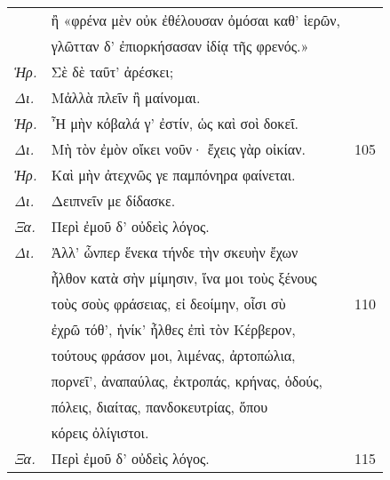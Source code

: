 \documentclass[13pt]{article}
\begin{document}
\begin{greek}
\begin{spacing}{1.5}
\begin{tabularx}{\textwidth}{@{}lXr@{}}
  & ἢ «φρένα μὲν οὐκ ἐθέλουσαν ὀμόσαι καθ' ἱερῶν, & \\
  & γλῶτταν δ' ἐπιορκήσασαν ἰδίᾳ τῆς φρενός.» & \\
  \textit{Ἡρ.} & Σὲ δὲ ταῦτ' ἀρέσκει; & \\
  \textit{Δι.} & \hspace*{8.5em}Μἀλλὰ πλεῖν ἢ μαίνομαι. & \\
  \textit{Ἡρ.} & Ἦ μὴν κόβαλά γ' ἐστίν, ὡς καὶ σοὶ δοκεῖ. & \\
  \textit{Δι.} & Μὴ τὸν ἐμὸν οἴκει νοῦν· ἔχεις γὰρ οἰκίαν. & 105 \\
  \textit{Ἡρ.} & Καὶ μὴν ἀτεχνῶς γε παμπόνηρα φαίνεται. & \\
  \textit{Δι.} & Δειπνεῖν με δίδασκε. & \\
  \textit{Ξα.} & \hspace*{8.5em}Περὶ ἐμοῦ δ' οὐδεὶς λόγος. & \\
  \textit{Δι.} & Ἀλλ' ὧνπερ ἕνεκα τήνδε τὴν σκευὴν ἔχων & \\
  & ἦλθον κατὰ σὴν μίμησιν, ἵνα μοι τοὺς ξένους & \\
  & τοὺς σοὺς φράσειας, εἰ δεοίμην, οἷσι σὺ & 110 \\
  & ἐχρῶ τόθ', ἡνίκ' ἦλθες ἐπὶ τὸν Κέρβερον, & \\
  & τούτους φράσον μοι, λιμένας, ἀρτοπώλια, & \\
  & πορνεῖ', ἀναπαύλας, ἐκτροπάς, κρήνας, ὁδούς, & \\
  & πόλεις, διαίτας, πανδοκευτρίας, ὅπου & \\
  & κόρεις ὀλίγιστοι. & \\
  \textit{Ξα.} & \hspace*{7.5em}Περὶ ἐμοῦ δ' οὐδεὶς λόγος. & 115 \\

\end{tabularx}

\end{spacing}

\newpage


\end{greek}
\end{document}
